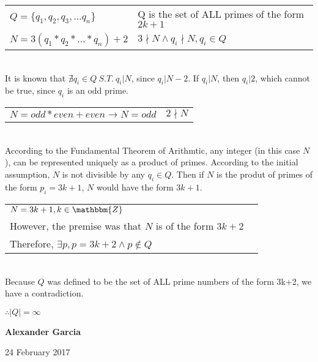 \documentclass[11pt]{article}
\def\AND{\wedge}
\def\imp{\rightarrow}
\begin{document}
\begin{enumerate}
		\begin{tabular}{ll}

			$Q = \{q_1, q_2, q_3, \dots q_n\}$ & Q is the set of ALL primes of 
							     the form $2k + 1$ \\

			$N = 3(q_1*q_2*\dots*q_n)+2$ & $3 \nmid N \AND q_i \nmid N, q_i \in Q$ \\ 

		\end{tabular} \\

		It is known that $\nexists q_i \in Q\ S.T.\ q_i | N$, since $q_i | N-2$.
		If $q_i | N$, then $q_i | 2$, which cannot be true, since $q_i$ is an odd prime.

		\begin{tabular}{ll}

			$N = odd * even + even \imp N = odd$ & $2 \nmid N$ \\
			
		\end{tabular} \\

		According to the Fundamental Theorem of Arithmtic, any integer (in this case $N$), 
		can be represented uniquely as a product of primes. According to the initial
		assumption, $N$ is not divisible by any $q_i \in Q$. Then if $N$ is the produt of 
		primes of the form $p_i = 3k + 1$, $N$ would have the form $3k+1$.

		\begin{tabular}{ll}

			$N = 3k + 1, k \in \mathbbm{Z}$ \\

			However, the premise was that $N$ is of the form $3k + 2$ \\

			Therefore, $\exists p, p = 3k + 2 \AND p \not\in Q$ \\

		\end{tabular} \\

		Because $Q$ was defined to be the set of ALL prime numbers of the form 3k+2, we
		have a contradiction. 

		$\therefore |Q| = \infty$ \\

		\newpage

		\textbf{Alexander Garcia}


		24 February 2017


\end{enumerate}
\end{document}
